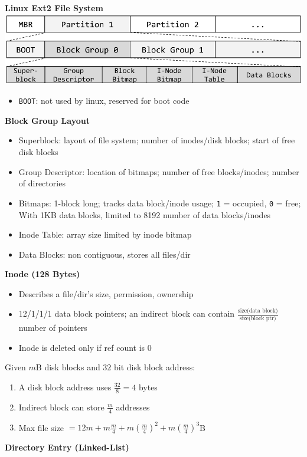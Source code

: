 \documentclass[a4paper, 12pt]{article}
\begin{document}
\begin{multicols*}{4}
\medskip

{\small\textbf{Linux Ext2 File System}} \\
\includegraphics[scale=0.195]{ext2-layout.png}
\begin{itemize}
	\item \texttt{BOOT}: not used by linux, reserved for boot code
\end{itemize}
\textbf{Block Group Layout}
\begin{itemize}
	\item Superblock: layout of file system; number of inodes/disk blocks; start of free disk blocks
	\item Group Descriptor: location of bitmaps; number of free blocks/inodes; number of directories
	\item Bitmaps: 1-block long; tracks data block/inode usage; \texttt{1} = occupied, \texttt{0} = free; With 1KB data blocks, limited to 8192 number of data blocks/inodes
	\item Inode Table: array size limited by inode bitmap
	\item Data Blocks: non contiguous, stores all files/dir
\end{itemize}
\textbf{Inode (128 Bytes)}
\begin{itemize}
	\item Describes a file/dir's size, permission, ownership
	\item 12/1/1/1 data block pointers; an indirect block can contain $\frac{\text{size(data block)}}{\text{size(block ptr)}}$ number of pointers
	\item Inode is deleted only if ref count is 0
\end{itemize}
Given $m$B disk blocks and $32$ bit disk block address:
\begin{enumerate}
	\item A disk block address uses $\frac{32}{8} = 4$ bytes
	\item Indirect block can store $\frac{m}{4}$ addresses
	\item Max file size $= 12m + m\frac{m}{4} + m(\frac{m}{4})^2 + m(\frac{m}{4})^3$B
\end{enumerate}
\textbf{Directory Entry (Linked-List)}
\begin{itemize}

\end{itemize}
\end{multicols*}
\end{document}
